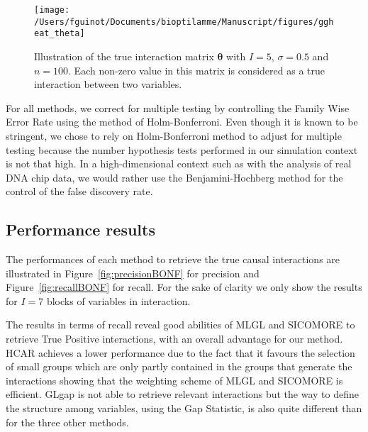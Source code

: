 \documentclass[]{book}
\begin{document}
\begin{figure}

{\centering \texttt{[image: /Users/fguinot/Documents/bioptilamme/Manuscript/figures/ggheat\_theta]} 

}

\caption{Illustration of the true interaction matrix \(\boldsymbol{\theta}\) with \(I = 5\), \(\sigma = 0.5\) and \(n=100\). Each non-zero value in this matrix is considered as a true interaction between two variables.}\label{fig:ggheatheta}
\end{figure}

For all methods, we correct for multiple testing by controlling the
Family Wise Error Rate using the method of Holm-Bonferroni. Even though
it is known to be stringent, we chose to rely on Holm-Bonferroni method
to adjust for multiple testing because the number hypothesis tests
performed in our simulation context is not that high. In a
high-dimensional context such as with the analysis of real DNA chip
data, we would rather use the Benjamini-Hochberg method for the control
of the false discovery rate.

\hypertarget{performance-results}{%
\subsection{Performance results}\label{performance-results}}

The performances of each method to retrieve the true causal interactions
are illustrated in Figure~\ref{fig:precisionBONF} for precision and
Figure~\ref{fig:recallBONF} for recall. For the sake of clarity we only show
the results for \(I=7\) blocks of variables in interaction.

The results in terms of recall reveal good abilities of MLGL and
SICOMORE to retrieve True Positive interactions, with an overall
advantage for our method. HCAR achieves a lower performance due to the
fact that it favours the selection of small groups which are only partly
contained in the groups that generate the interactions showing that the
weighting scheme of MLGL and SICOMORE is efficient. GLgap is not able to
retrieve relevant interactions but the way to define the structure among
variables, using the Gap Statistic, is also quite different than for the
three other methods.
\end{document}
